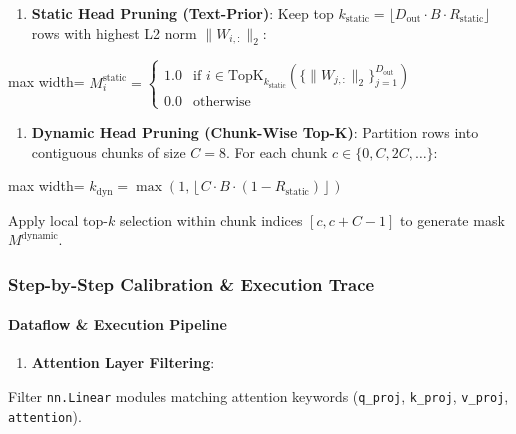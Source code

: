 \begin{enumerate}
\item \textbf{Static Head Pruning (Text-Prior)}:
Keep top $k_{\text{static}} = \lfloor D_{\text{out}} \cdot B \cdot R_{\text{static}} \rfloor$ rows with highest L2 norm $\|W_{i, :}\|_2$:
\end{enumerate}
\begin{center}
\begin{adjustbox}{max width=\columnwidth}
$\displaystyle
M_i^{\text{static}} = \begin{cases} 1.0 & \text{if } i \in \text{TopK}_{k_{\text{static}}}\left( \{ \|W_{j, :}\|_2 \}_{j=1}^{D_{\text{out}}} \right) \\ 0.0 & \text{otherwise} \end{cases}
$
\end{adjustbox}
\end{center}

\begin{enumerate}
\item \textbf{Dynamic Head Pruning (Chunk-Wise Top-K)}:
Partition rows into contiguous chunks of size $C = 8$. For each chunk $c \in \{0, C, 2C, \dots\}$:
\end{enumerate}
\begin{center}
\begin{adjustbox}{max width=\columnwidth}
$\displaystyle
k_{\text{dyn}} = \max\left(1, \left\lfloor C \cdot B \cdot (1 - R_{\text{static}}) \right\rfloor\right)
$
\end{adjustbox}
\end{center}
Apply local top-$k$ selection within chunk indices $[c, c+C-1]$ to generate mask $M^{\text{dynamic}}$.


\subsubsection*{Step-by-Step Calibration \& Execution Trace}

\paragraph{Dataflow \& Execution Pipeline}

\begin{enumerate}
\item \textbf{Attention Layer Filtering}:
\end{enumerate}
Filter \texttt{nn.Linear} modules matching attention keywords (\texttt{q\_proj}, \texttt{k\_proj}, \texttt{v\_proj}, \texttt{attention}).

